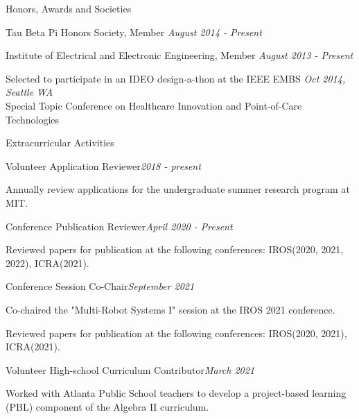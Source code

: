 \documentclass{resume} %
\begin{document}
\begin{rSection}{Honors, Awards and Societies}

\begin{rSubsection}{}{}{}{}
\item Tau Beta Pi Honors Society, Member \hfill {\em August 2014 - Present}
\item Institute of Electrical and Electronic Engineering, Member \hfill {\em August 2013 - Present}
\item Selected to participate in an IDEO design-a-thon at the IEEE EMBS \hfill {\em Oct 2014, Seattle WA}\\ Special Topic Conference on Healthcare Innovation and Point-of-Care Technologies 
\end{rSubsection}

\end{rSection}

\begin{rSection}{Extracurricular Activities}

\begin{rSubsection}{Volunteer Application Reviewer}{\em 2018 - present}{}{}
\item Annually review applications for the undergraduate summer research program at MIT.
\end{rSubsection}

\begin{rSubsection}{Conference Publication Reviewer}{\em April 2020 - Present}{}{}
\item Reviewed papers for publication at the following conferences: IROS(2020, 2021, 2022), ICRA(2021).
\end{rSubsection}

\begin{rSubsection}{Conference Session Co-Chair}{\em September 2021}{}{}
\item Co-chaired the "Multi-Robot Systems I" session at the IROS 2021 conference.
\item Reviewed papers for publication at the following conferences: IROS(2020, 2021), ICRA(2021).
\end{rSubsection}

\begin{rSubsection}{Volunteer High-school Curriculum Contributor}{\em March 2021}{}{}
\item Worked with Atlanta Public School teachers to develop a project-based learning (PBL) component of the Algebra II curriculum.
\end{rSubsection}

\end{rSection}
\end{document}
